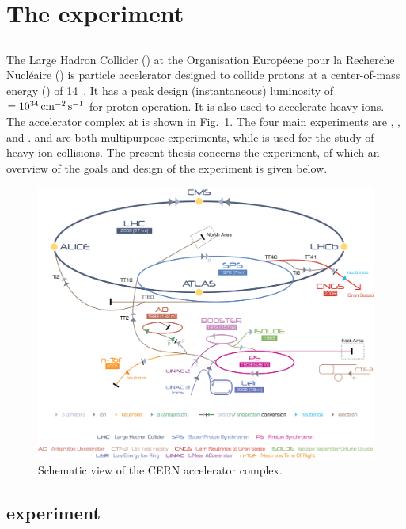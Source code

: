 \section{The \lhcb experiment}
\label{sec:lhcb}

\subsection{\lhc}
\label{sec:lhcb:lhc}

The Large Hadron Collider (\lhc) at the Organisation Europ\'eene pour la Recherche Nucl\'eaire (\cern) is particle accelerator designed to collide protons at a center-of-mass energy (\sqs) of 14\tev~\cite{lhc}. It has a peak design (instantaneous) luminosity of \lum$= 10^{34}\mathrm{ \,cm}^{-2}\mathrm{{\,s}}^{-1}$ for proton operation. It is also used to accelerate heavy ions. The accelerator complex at \cern is shown in Fig.~\ref{fig:lhc}. The four main experiments are \atlas, \cms, \lhcb and \alice. \atlas and \cms are both multipurpose experiments, while \alice is used for the study of heavy ion collisions. The present thesis concerns the \lhcb experiment, of which an overview of the goals and design of the experiment is given below.

\begin{figure}[!htb]
\centering
\includegraphics[width=\textwidth]{figs/detector/lhc.jpg}
\caption{Schematic view of the CERN accelerator complex.}
\label{fig:lhc}
\end{figure}

\subsection{\lhcb experiment}
\label{sec:lhcb:lhcb}

